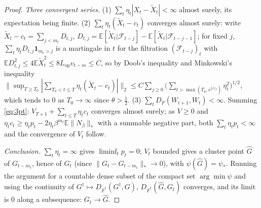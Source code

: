 \documentclass[10pt]{article}
\theoremstyle{definition}
\theoremstyle{remark}
\newcommand{\E}{\mathbb{E}}
\newcommand{\nnuc}[1]{\|#1\|_{*}}
\newcommand{\Lop}{L_{\mathrm{op}}}
\newcommand{\cF}{\mathcal{F}}
\newcommand{\st}{\dagger}
\begin{document}
\begin{proof}
\emph{Three convergent series.} (1) $\sum_t\eta_t|X_t-\tilde X_t|<\infty$ almost surely, its expectation being finite.
(2) $\sum_t\eta_t(\tilde X_t-c_t)$ converges almost surely: write
$\tilde X_t-c_t=\sum_{j<m_t}D_{t,j}$, $D_{t,j}=\E[\tilde X_t|\cF_{t-j}]-\E[\tilde X_t|\cF_{t-j-1}]$; for fixed $j$,
$\sum_t\eta_tD_{t,j}\mathbf 1_{m_t>j}$ is a martingale in $t$ for the filtration $(\cF_{t-j})_t$ with
$\E D_{t,j}^2\le4\E\tilde X_t^2\le8\Lop v_{t-m}\le C$, so by Doob's inequality and Minkowski's inequality
$\|\sup_{T\ge T_0}|\sum_{T_0<t\le T}\eta_t(\tilde X_t-c_t)|\|_2\le C\sum_{j\ge0}\big(\sum_{t>\max(T_0,e^{j/c_\beta})}\eta_t^2\big)^{1/2}$,
which tends to $0$ as $T_0\to\infty$ since $\theta>\frac12$. (3) $\sum_tD_F(W_{t+1},W_t)<\infty$. Summing
\eqref{eq:3pt}: $V_{T+1}+\sum_{t\le T}\eta_tc_t$ converges almost surely; as $V\ge0$ and
$\eta_tc_t\ge\eta_tp_t-2\eta_t\beta^{m_t}\E\nnuc{N_\beta}$ with a summable negative part, both $\sum_t\eta_tp_t<\infty$ and
the convergence of $V_t$ follow.

\emph{Conclusion.} $\sum_t\eta_t=\infty$ gives $\liminf_tp_t=0$; $V_t$ bounded gives a cluster point $\hat G$ of
$G_{t-m_t}$, hence of $G_t$ (since $\nnuc{G_t-G_{t-m_t}}\to0$), with $\psi(\hat G)=\psi_\ast$. Running the argument for a
countable dense subset of the compact set $\arg\min\psi$ and using the continuity of $G^\st\mapsto D_{F^\ast}(G^\st,G)$,
$D_{F^\ast}(\hat G,G_t)$ converges, and its limit is $0$ along a subsequence: $G_t\to\hat G$.
\end{proof}
\end{document}
